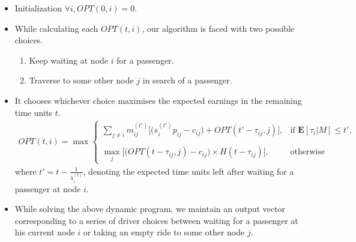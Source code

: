 \begin{itemize}
\item Initialization
    $\forall i, OPT(0,i) = 0$.
    
\item While calculating each $OPT(t,i)$, our algorithm is faced with two possible choices.
    \begin{enumerate}
    \item Keep waiting at node $i$ for a passenger.
    \item Traverse to some other node $j$ in search of a passenger.
    \end{enumerate}
\item It chooses whichever choice maximises the expected earnings in the remaining time units $t$. 
\begin{eqnarray*}
OPT(t,i) = \max
    \begin{cases}
    \sum\limits_{j\neq i}m_{ij}^{(t')}\bigg[\Big(s_{i}^{(t')} p_{ij} - c_{ij}\Big) + OPT(t'-\tau_{ij},j)\bigg], & \text{if } \mathbf{E}[\tau_i|M] \leq t',\\ \\
    \max\limits_{j}\Big[\Big(OPT(t-\tau_{ij},j) - c_{ij}\Big)\times H(t - \tau_{ij})\Big], & \text{otherwise}
    \end{cases}
\end{eqnarray*}
where $t' = t - \frac{1}{\lambda_i^{(t)}}$, denoting the expected time units left after waiting for a passenger at node $i$.

\item While solving the above dynamic program, we maintain an output vector corresponding to a series of driver choices between waiting for a passenger at his current node $i$ or taking an empty ride to some other node $j$.
\end{itemize}


